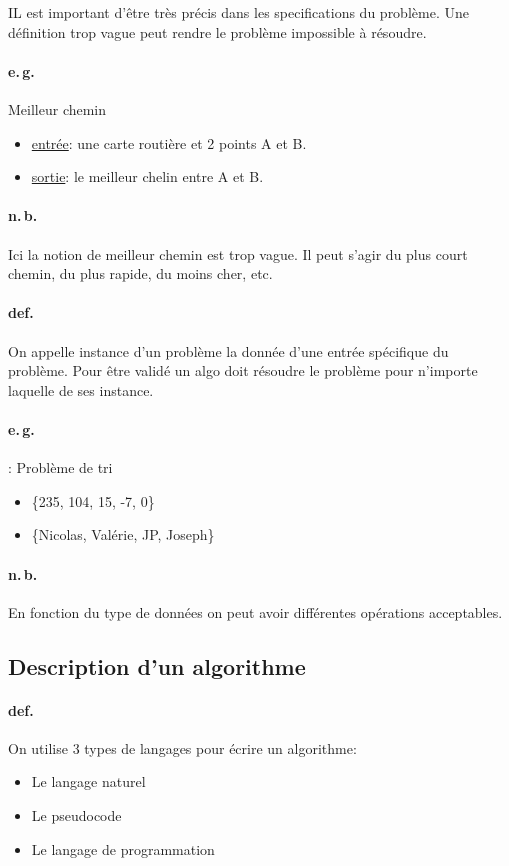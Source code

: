 \documentclass{report}
\begin{document}
  IL est important d'être très précis dans les specifications du problème. Une définition trop vague peut rendre le problème impossible à résoudre.

  \paragraph{e.\,g.} Meilleur chemin
  \begin{itemize}
    \item \underline{entrée}: une carte routière et 2 points A et B.
    \item \underline{sortie}: le meilleur chelin entre A et B.
  \end{itemize}

  \paragraph{n.\,b.} Ici la notion de meilleur chemin est trop vague. Il peut s'agir du plus court chemin, du plus rapide, du moins cher, etc.

  \paragraph{def.} On appelle instance d'un problème la donnée d'une entrée spécifique du problème. Pour être validé un algo doit résoudre le problème pour n'importe laquelle de ses instance.

  \paragraph{e.\,g.}: Problème de tri
  \begin{itemize}
    \item \{235, 104, 15, -7, 0\}
    \item \{Nicolas, Valérie, JP, Joseph\}
  \end{itemize}

  \paragraph{n.\,b.} En fonction du type de données on peut avoir différentes opérations acceptables.

\subsection{Description d'un algorithme}

  \paragraph{def.} On utilise 3 types de langages pour écrire un algorithme:
  \begin{itemize}
    \item Le langage naturel
    \item Le pseudocode
    \item Le langage de programmation
  \end{itemize}
\end{document}
